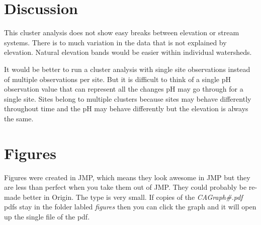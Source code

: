 \documentclass[11pt]{article} %
\begin{document}
\section{Discussion}

This cluster analysis does not show easy breaks between elevation or stream systems.  There is to much variation in the data that is not explained by elevation. Natural elevation bands would be easier within individual watersheds.

It would be better to run a cluster analysis with single site observations instead of multiple observations per site.  But it is difficult to think of a single pH observation value that can represent all the changes pH may go through for a single site.  Sites belong to multiple clusters because sites may behave differently throughout time and the pH may behave differently but the elevation is always the same.
\pagebreak

\section{Figures}
Figures were created in JMP, which means they look awesome in JMP but they are less than perfect when you take them out of JMP.  They could probably be re-made better in Origin.
The type is very small.  If copies of the {\it CAGraph\#.pdf}  pdfs stay in the folder labled {\it figures}  then you can click the graph and it will open up the single file of the pdf.
\pagebreak

\label{CAGraph1}


\label{CAGraph2}


\label{CAGraph3}


\label{CAGraph6}


\label{CAGraph8}


\label{CAGraph9}


\label{CAGraph10}

\end{document}
